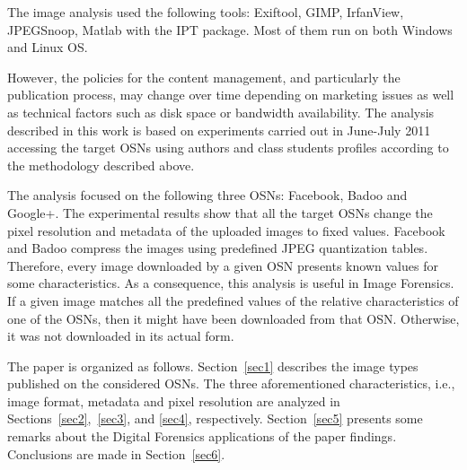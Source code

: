 \documentclass[10pt, conference]{IEEEtran}
\begin{document}
The image analysis used the following tools: Exiftool, GIMP, IrfanView, JPEGSnoop, Matlab with the IPT package. Most of them run on both Windows and Linux OS.

However, the policies for the content management, and particularly the publication process, may change over time depending on marketing issues as well as technical factors such as disk space or bandwidth availability. The analysis described in this work is based on experiments carried out in June-July 2011 accessing the target OSNs using authors and class students profiles according to the methodology described above.

The analysis focused on the following three OSNs: Facebook, Badoo and Google+. 
The experimental results show that all the target OSNs change the pixel resolution and metadata of the uploaded images to fixed values. Facebook and Badoo compress the images using predefined  JPEG quantization tables.
Therefore, every image downloaded by a given OSN presents known values for some characteristics.
As a consequence, this analysis is useful in Image Forensics. If a given image matches all the predefined values of the relative characteristics of one of the OSNs, then it might have been downloaded from that OSN. Otherwise, it was not downloaded in its actual form.


The paper is organized as follows. Section~\ref{sec1} describes the image types published on the considered OSNs. 
The three aforementioned characteristics, i.e., image format, metadata and pixel resolution are analyzed in Sections~\ref{sec2},~\ref{sec3}, and \ref{sec4}, respectively. Section~\ref{sec5} presents some remarks about the Digital Forensics applications of the paper findings. Conclusions are made in Section~\ref{sec6}.
\end{document}
